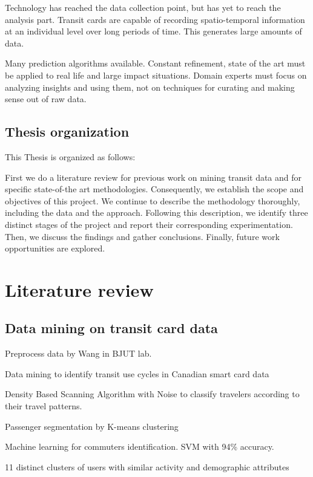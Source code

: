 \documentclass{article}
\begin{document}
Technology has reached the data collection point, but has yet to reach the analysis part. Transit cards are capable of recording spatio-temporal information at an individual level over long periods of time. This generates large amounts of data. 

Many prediction algorithms available. Constant refinement, state of the art must be applied to real life and large impact situations. Domain experts must focus on analyzing insights and using them, not on techniques for curating and making sense out of raw data. 

\subsection{Thesis organization}
This Thesis is organized as follows:

First we do a literature review for previous work on mining transit data and for specific state-of-the art methodologies. Consequently, we establish the scope and objectives of this project. We continue to describe the methodology thoroughly, including the data and the approach. Following this description, we identify three distinct stages of the project and report their corresponding experimentation. Then, we discuss the findings and gather conclusions. Finally, future work opportunities are explored. 


\newpage
\section{Literature review}

\subsection{Data mining on transit card data}
Preprocess data by Wang in BJUT lab. \cite{wang2014research}

Data mining to identify transit use cycles in Canadian smart card data \cite{morency2007measuring}

Density Based Scanning Algorithm with Noise to classify travelers according to their travel patterns.  \cite{ma2013mining}

Passenger segmentation by K-means clustering \cite{bhaskar2015passenger}

Machine learning for commuters identification. SVM with 94\% accuracy. \cite{tu2016impact}

11 distinct clusters of users with similar activity and demographic attributes \cite{langlois2016inferring}
\end{document}
